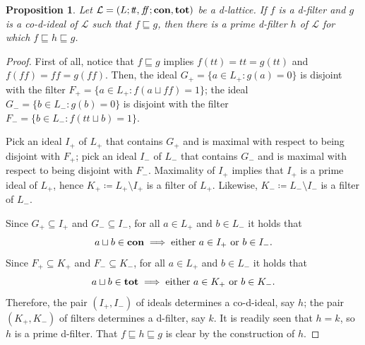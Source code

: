 \documentclass[11pt]{article}
\theoremstyle{plain}
\newtheorem{prop}[thm]{Proposition}
\theoremstyle{definition}
\newcommand{\dbt}{{t\!t}}
\newcommand{\dbf}{{f\!\!f}}
\begin{document}
\begin{prop} Let $\mathcal{L}=(L;\dbt,\dbf;{\bf con},{\bf tot})$ be a d-lattice. If $f$ is a d-filter  and $g$ is a co-d-ideal of $\mathcal{L}$ such that  $f\sqsubseteq g$, then there is a prime d-filter $h$ of $\mathcal{L}$ for which $f\sqsubseteq h\sqsubseteq g$. \end{prop}

\begin{proof} First of all, notice that $f\sqsubseteq g$ implies $f(\dbt)=\dbt=g(\dbt)$ and $f(\dbf)=\dbf=g(\dbf)$. Then, the ideal  $G_+=\{a\in L_+:g(a)=0\}$ is disjoint with the filter $ 
F_+=\{a\in L_+:f(a\sqcup\dbf)=1\}$; the ideal  $G_-=\{b\in L_-:g(b)=0\}$ is disjoint with the filter $F_-=\{b\in L_-:f(\dbt\sqcup b)=1\}.$ 

Pick an ideal $I_+$ of $L_+$ that contains $G_+$ and is maximal with respect to being disjoint with $F_+$; pick an ideal $I_-$ of  $L_-$ that contains $G_-$ and is maximal with respect to being disjoint with $F_-$. Maximality of $I_+$ implies that $I_+$ is a prime ideal of $L_+$, hence $K_+\coloneqq L_+\setminus I_+$ is a filter of $L_+$. Likewise, $K_-\coloneqq L_-\setminus I_-$ is a filter of $L_-$. 

Since $G_+\subseteq I_+$ and $G_-\subseteq I_-$,   for all $a\in L_+$ and $b\in L_-$ it holds that $$ a\sqcup b\in{\bf con}\implies \text{either $a\in I_+$ or $b\in I_-$}.$$ Since $F_+\subseteq K_+$ and $F_-\subseteq K_-$,   for all $a\in L_+$ and $b\in L_-$ it holds that  $$ a\sqcup b\in{\bf tot}\implies \text{either $a\in K_+$ or $b\in K_-$}.$$ Therefore, the pair $(I_+,I_-)$ of ideals determines a co-d-ideal, say $h$; the pair $(K_+,K_-)$ of filters determines a d-filter, say $k$. It is readily seen that $h=k$, so $h$ is a prime d-filter. That $f\sqsubseteq h\sqsubseteq g$ is clear by the construction of $h$.
\end{proof}
  
\end{document}
